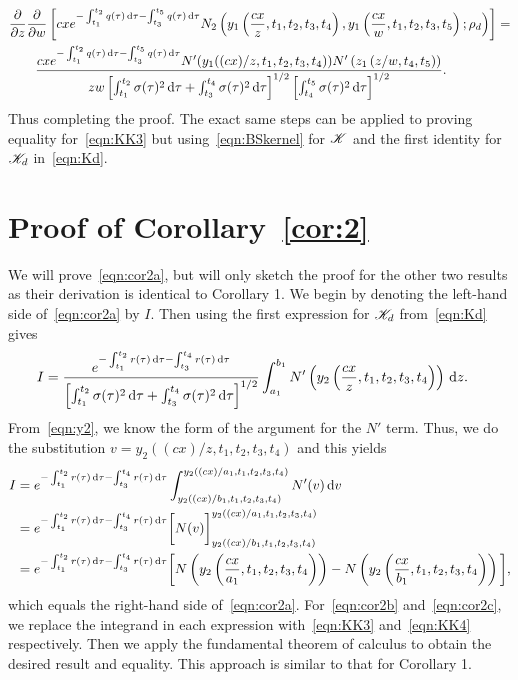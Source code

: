 	\begin{align*}
		&\frac{\partial}{\partial z}\frac{\partial}{\partial w}\left[ cxe^{-\int_{t_1}^{t_2} q(\tau) \,\mathrm d\tau-\int_{t_3}^{t_5} q(\tau) \, \mathrm d\tau}  N_2\left( y_1\left(\frac{cx}{z}, t_1, t_2, t_3, t_4\right), y_1\left( \frac{cx}{w}, t_1, t_2, t_3, t_5 \right); \rho_d \right)\right] = \\
		&\qquad \frac{cxe^{-\int_{t_1}^{t_2} q(\tau) \,\mathrm d\tau - \int_{t_3}^{t_5} q(\tau) \, \mathrm d\tau}N'(y_1((cx)/z,t_1,t_2,t_3,t_4))N'\left( z_1\left(  z/w, t_4, t_5 \right) \right)}{zw\left[\int_{t_1}^{t_2} \sigma(\tau)^2 \,\mathrm d\tau + \int_{t_3}^{t_4} \sigma(\tau)^2 \, \mathrm d\tau\right]^{1/2}\left[\int_{t_4}^{t_5} \sigma(\tau)^2 \,\mathrm d\tau\right]^{1/2}}.
	\end{align*}
Thus completing the proof. The exact same steps can be applied to proving equality for~\eqref{eqn:KK3} but using~\eqref{eqn:BSkernel} for $\mathscr K$ and the first identity for $\mathscr K_d$ in~\eqref{eqn:Kd}.

\section{Proof of Corollary~\ref{cor:2}}
We will prove~\eqref{eqn:cor2a}, but will only sketch the proof for the other two results as their derivation is identical to Corollary 1. We begin by denoting the left-hand side of~\eqref{eqn:cor2a} by $I$. Then using the first expression for $\mathscr K_d$ from~\eqref{eqn:Kd} gives
	\begin{align*}
		I &= \frac{e^{-\int_{t_1}^{t_2} r(\tau) \, \mathrm d\tau - \int_{t_3}^{t_4} r(\tau) \,\mathrm d\tau}}{\left[ \int_{t_1}^{t_2} \sigma(\tau)^2 \,\mathrm d\tau + \int_{t_3}^{t_4} \sigma(\tau)^2 \,\mathrm d\tau \right]^{1/2}}\int_{a_1}^{b_1} N'\left( y_2\left( \frac{cx}{z}, t_1, t_2, t_3, t_4 \right) \right) \, \mathrm d z.
	\end{align*}
From~\eqref{eqn:y2}, we know the form of the argument for the $N'$ term. Thus, we do the substitution $v = y_2((cx)/z,t_1,t_2,t_3,t_4)$ and this yields
	\begin{align*}
		I &= e^{-\int_{t_1}^{t_2} r(\tau) \, \mathrm d\tau - \int_{t_3}^{t_4} r(\tau) \,\mathrm d\tau}\int_{y_2\left((cx)/b_1,t_1,t_2,t_3,t_4\right)}^{y_2\left((cx)/a_1,t_1,t_2,t_3,t_4\right)} N'(v) \, \mathrm d v \\
		&= e^{-\int_{t_1}^{t_2} r(\tau) \, \mathrm d\tau - \int_{t_3}^{t_4} r(\tau) \,\mathrm d\tau}\bigg[ N(v) \bigg]_{y_2\left((cx)/b_1,t_1,t_2,t_3,t_4\right)}^{y_2\left((cx)/a_1,t_1,t_2,t_3,t_4\right)} \\
		&= e^{-\int_{t_1}^{t_2} r(\tau) \, \mathrm d\tau - \int_{t_3}^{t_4} r(\tau) \,\mathrm d\tau} \bigg[ N\left(y_2\left( \frac{cx}{a_1}, t_1, t_2, t_3, t_4 \right) \right) - N\left(y_2\left( \frac{cx}{b_1}, t_1, t_2, t_3, t_4 \right) \right) \bigg],
	\end{align*}
which equals the right-hand side of~\eqref{eqn:cor2a}. For~\eqref{eqn:cor2b} and~\eqref{eqn:cor2c}, we replace the integrand in each expression with~\eqref{eqn:KK3} and~\eqref{eqn:KK4} respectively. Then we apply the fundamental theorem of calculus to obtain the desired result and equality. This approach is similar to that for Corollary 1.